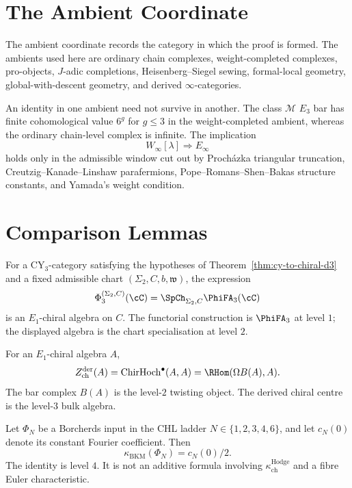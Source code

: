 \section{The Ambient Coordinate}
\label{sec:tas-ambient}

The ambient coordinate records the category in which the proof is
formed.  The ambients used here are ordinary chain complexes,
weight-completed complexes, pro-objects, \(J\)-adic completions,
Heisenberg--Siegel sewing, formal-local geometry,
global-with-descent geometry, and derived \(\infty\)-categories.

An identity in one ambient need not survive in another.  The class
\(\mathcal M\) \(E_3\) bar has finite cohomological value \(6^g\) for
\(g\leq3\) in the weight-completed ambient, whereas the ordinary
chain-level complex is infinite.  The implication
\[
W_\infty[\lambda]\Longrightarrow E_\infty
\]
holds only in the admissible window cut out by Proch\'azka triangular
truncation, Creutzig--Kanade--Linshaw parafermions,
Pope--Romans--Shen--Bakas structure constants, and Yamada's weight
condition.

\section{Comparison Lemmas}
\label{sec:tas-examples}

\begin{lemma}[The \(d=3\) chiral output]
For a CY\(_3\)-category satisfying the hypotheses of
Theorem~\ref{thm:cy-to-chiral-d3} and a fixed admissible chart
\((\Sigma_2,C,b,\mathfrak w)\), the expression
\[
\Phi^{(\Sigma_2,C)}_3(\cC)
=\SpCh_{\Sigma_2,C}\PhiFA_3(\cC)
\]
is an \(E_1\)-chiral algebra on \(C\).  The functorial construction is
\(\PhiFA_3\) at level \(1\); the displayed algebra is the chart
specialisation at level \(2\).
\end{lemma}

\begin{lemma}
For an \(E_1\)-chiral algebra \(A\),
\[
\Zder(A)=\mathrm{ChirHoch}^{\bullet}(A,A)=\RHom(\Omega B(A),A).
\]
The bar complex \(B(A)\) is the level-\(2\) twisting object.  The derived
chiral centre is the level-\(3\) bulk algebra.
\end{lemma}

\begin{lemma}
Let \(\Phi_N\) be a Borcherds input in the CHL ladder
\(N\in\{1,2,3,4,6\}\), and let \(c_N(0)\) denote its constant Fourier
coefficient.  Then
\[
\kappa_{\mathrm{BKM}}(\Phi_N)=c_N(0)/2 .
\]
The identity is level \(4\).  It is not an additive formula involving
\(\kappa_{\mathrm{ch}}^{\mathrm{Hodge}}\) and a fibre Euler
characteristic.
\end{lemma}

